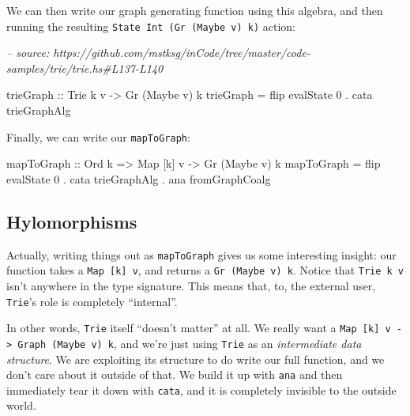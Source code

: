 \documentclass[]{article}
\newenvironment{Shaded}{}{}
\newcommand{\CommentTok}[1]{\textcolor[rgb]{0.38,0.63,0.69}{\textit{#1}}}
\newcommand{\DataTypeTok}[1]{\textcolor[rgb]{0.56,0.13,0.00}{#1}}
\newcommand{\DecValTok}[1]{\textcolor[rgb]{0.25,0.63,0.44}{#1}}
\newcommand{\FunctionTok}[1]{\textcolor[rgb]{0.02,0.16,0.49}{#1}}
\newcommand{\NormalTok}[1]{#1}
\newcommand{\OtherTok}[1]{\textcolor[rgb]{0.00,0.44,0.13}{#1}}
\begin{document}
We can then write our graph generating function using this algebra, and then
running the resulting \texttt{State\ Int\ (Gr\ (Maybe\ v)\ k)} action:

\begin{Shaded}
\begin{Highlighting}[]
\CommentTok{-- source: https://github.com/mstksg/inCode/tree/master/code-samples/trie/trie.hs#L137-L140}

\NormalTok{trieGraph}
\OtherTok{    ::} \DataTypeTok{Trie}\NormalTok{ k v}
    \OtherTok{->} \DataTypeTok{Gr}\NormalTok{ (}\DataTypeTok{Maybe}\NormalTok{ v) k}
\NormalTok{trieGraph }\FunctionTok{=}\NormalTok{ flip evalState }\DecValTok{0} \FunctionTok{.}\NormalTok{ cata trieGraphAlg}
\end{Highlighting}
\end{Shaded}

Finally, we can write our \texttt{mapToGraph}:

\begin{Shaded}
\begin{Highlighting}[]
\NormalTok{mapToGraph}
\OtherTok{    ::} \DataTypeTok{Ord}\NormalTok{ k}
    \OtherTok{=>} \DataTypeTok{Map}\NormalTok{ [k] v}
    \OtherTok{->} \DataTypeTok{Gr}\NormalTok{ (}\DataTypeTok{Maybe}\NormalTok{ v) k}
\NormalTok{mapToGraph }\FunctionTok{=}\NormalTok{ flip evalState }\DecValTok{0}
           \FunctionTok{.}\NormalTok{ cata trieGraphAlg}
           \FunctionTok{.}\NormalTok{ ana fromGraphCoalg}
\end{Highlighting}
\end{Shaded}

\hypertarget{hylomorphisms}{%
\subsection{Hylomorphisms}\label{hylomorphisms}}

Actually, writing things out as \texttt{mapToGraph} gives us some interesting
insight: our function takes a \texttt{Map\ {[}k{]}\ v}, and returns a
\texttt{Gr\ (Maybe\ v)\ k}. Notice that \texttt{Trie\ k\ v} isn't anywhere in
the type signature. This means that, to, the external user, \texttt{Trie}'s role
is completely ``internal''.

In other words, \texttt{Trie} itself ``doesn't matter'' at all. We really want a
\texttt{Map\ {[}k{]}\ v\ -\textgreater{}\ Graph\ (Maybe\ v)\ k}, and we're just
using \texttt{Trie} as an \emph{intermediate data structure}. We are exploiting
its structure to do write our full function, and we don't care about it outside
of that. We build it up with \texttt{ana} and then immediately tear it down with
\texttt{cata}, and it is completely invisible to the outside world.
\end{document}
